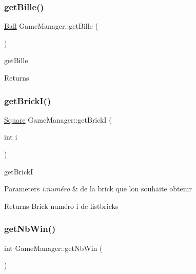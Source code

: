 \subsubsection{\texorpdfstring{get\+Bille()}{getBille()}}
{\footnotesize\ttfamily \mbox{\hyperlink{class_ball}{Ball}} Game\+Manager\+::get\+Bille (\begin{DoxyParamCaption}{ }\end{DoxyParamCaption})\hspace{0.3cm}{\ttfamily [inline]}}



get\+Bille 

\begin{DoxyReturn}{Returns}

\end{DoxyReturn}
\mbox{\label{class_game_manager_ac3efa1f197bd8d0869b41bd969e02fd0}} 
\subsubsection{\texorpdfstring{get\+Brick\+I()}{getBrickI()}}
{\footnotesize\ttfamily \mbox{\hyperlink{class_square}{Square}} Game\+Manager\+::get\+BrickI (\begin{DoxyParamCaption}\item[{int}]{i }\end{DoxyParamCaption})\hspace{0.3cm}{\ttfamily [inline]}}



get\+BrickI 


\begin{DoxyParams}{Parameters}
{\em i\+:numéro} & de la brick que l\textquotesingle{}on souhaite obtenir \\
\hline
\end{DoxyParams}
\begin{DoxyReturn}{Returns}
Brick numéro i de listbricks 
\end{DoxyReturn}
\mbox{\label{class_game_manager_a8b770addd88c3e9dba5691e38ec59a2b}} 
\subsubsection{\texorpdfstring{get\+Nb\+Win()}{getNbWin()}}
{\footnotesize\ttfamily int Game\+Manager\+::get\+Nb\+Win (\begin{DoxyParamCaption}{ }\end{DoxyParamCaption})\hspace{0.3cm}{\ttfamily [inline]}}




